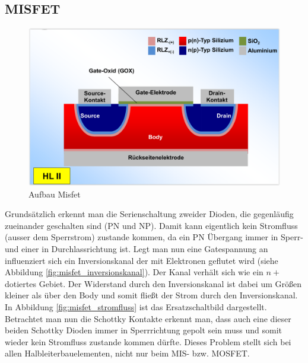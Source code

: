 \documentclass[12pt,a4paper]{report}%
\numberwithin{equation}{section}
\numberwithin{equation}{subsection}
\begin{document}
    \subsection{MISFET}
      \begin{figure}[H]
			  \centering
			  \captionsetup{justification=centering}
			  \includegraphics[width=0.6\linewidth]{misfet_aufbau.png}
			  \caption{Aufbau Misfet \protect\cite{MIKRO2}}
			  \label{fig:misfet_aufbau}
			\end{figure}
			Grundsätzlich erkennt man die Serienschaltung zweider Dioden, die gegenläufig zueinander geschalten sind (PN und NP). Damit kann eigentlich kein Stromfluss (ausser dem Sperrstrom) zustande kommen, da ein PN Übergang immer in Sperr- und einer in Durchlassrichtung ist. Legt man nun eine Gatespannung an influenziert sich ein Inversionskanal der mit Elektronen geflutet wird (siehe Abbildung \ref{fig:misfet_inversionskanal}). Der Kanal verhält sich wie ein $n+$ dotiertes Gebiet. Der Widerstand durch den Inversionskanal ist dabei um Größen kleiner als über den Body und somit fließt der Strom durch den Inversionskanal. In Abbildung \eqref{fig:misfet_stromfluss} ist das Ersatzschaltbild dargestellt. Betrachtet man nun die Schottky Kontakte erkennt man, dass auch eine dieser beiden Schottky Dioden immer in Sperrrichtung gepolt sein muss und somit wieder kein Stromfluss zustande kommen dürfte. Dieses Problem stellt sich bei allen Halbleiterbauelementen, nicht nur beim MIS- bzw. MOSFET.
\end{document}
